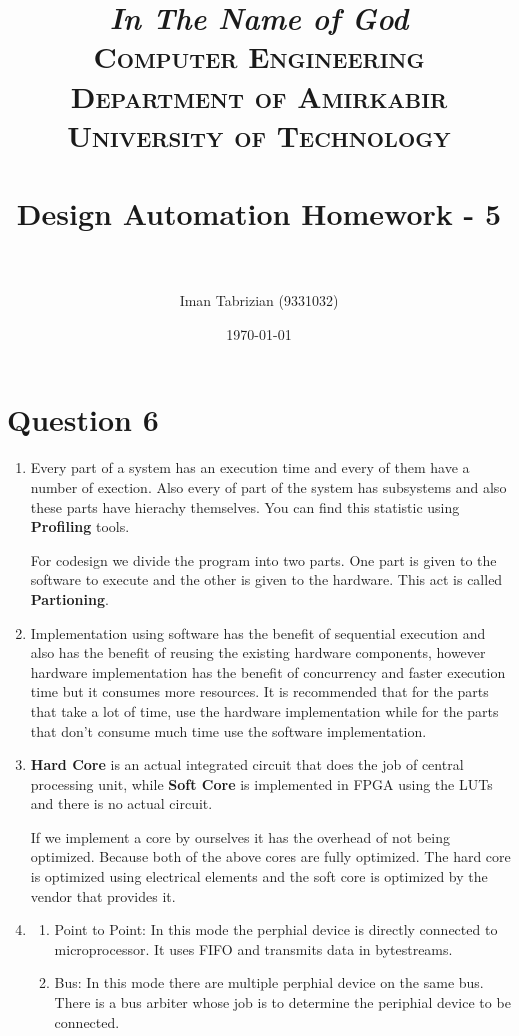 \documentclass[paper=b4, fontsize=11pt]{scrartcl} %
\title{
\normalfont \normalsize
\textit{In The Name of God} \\ \textsc{Computer Engineering Department of Amirkabir University of Technology} \\ [25pt] \horrule{0.5pt} \\[0.4cm] %
\huge Design Automation Homework - 5 \\ %
\horrule{2pt} \\[0.5cm] %
}
\author{Iman Tabrizian (9331032)}
\date{\normalsize\today}
\numberwithin{equation}{section} %
\numberwithin{figure}{section} %
\numberwithin{table}{section} %
\begin{document}
\maketitle
\section{Question 6}

\begin{enumerate}[label=(\alph*)]
    \item
        \par Every part of a system has an execution time and every of them
        have a number of exection. Also every of part of the system has subsystems
        and also these parts have hierachy themselves. You can find this statistic
        using \textbf{Profiling} tools.

        \par For codesign we divide the program into two parts. One part is given
        to the software to execute and the other is given to the hardware. This
        act is called \textbf{Partioning}.
    \item
        \par Implementation using software has the benefit of sequential
        execution and also has the benefit of reusing the existing hardware
        components, however hardware implementation has the benefit of
        concurrency and faster execution time but it consumes more resources.
        It is recommended that for the parts that take a lot of time, use the
        hardware implementation while for the parts that don't consume much
        time use the software implementation.
    \item
        \par \textbf{Hard Core} is an actual integrated circuit that does the
        job of central processing unit, while \textbf{Soft Core} is implemented
        in FPGA using the LUTs and there is no actual circuit.

        If we implement a core by ourselves it has the overhead of not being
        optimized. Because both of the above cores are fully optimized. The
        hard core is optimized using electrical elements and the soft core is
        optimized by the vendor that provides it.

    \item
        \begin{enumerate}
            \item
                Point to Point: In this mode the perphial device is directly
                connected to microprocessor. It uses FIFO and transmits data
                in bytestreams.
            \item
                Bus: In this mode there are multiple perphial device on the
                same bus. There is a bus arbiter whose job is to determine the
                periphial device to be connected.
        \end{enumerate}

\end{enumerate}
\end{document}
